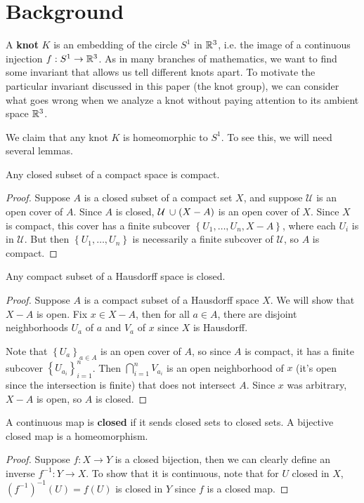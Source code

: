 \documentclass[twoside,10pt]{article}
\begin{document}
\section{Background}

A \textbf{knot} $K$ is an embedding of the circle $S^{1}$ in $\mathbb{R}^{3}$, i.e. the image of a continuous injection $f:S^{1}\to \mathbb{R}^{3}$. As in many branches of mathematics, we want to find some invariant that allows us tell different knots apart. To motivate the particular invariant discussed in this paper (the knot group), we can consider what goes wrong when we analyze a knot without paying attention to its ambient space $\mathbb{R}^{3}$.

We claim that any knot $K$ is homeomorphic to $S^{1}$. To see this, we will need several lemmas.


\begin{lem}
	\label{closed-compact}
Any closed subset of a compact space is compact.
\end{lem}
\begin{proof}
	Suppose $A$ is a closed subset of a compact set $X$, and suppose $\mathcal{U}$ is an open cover of $A$. Since $A$ is closed, $\mathcal{U} \operatorname{\;\cup\;} (X-A)$ is an open cover of $X$. Since $X$ is compact, this cover has a finite subcover $\left\{ U_1, \dots, U_n, X-A \right\}$, where each $U_i$ is in $\mathcal{U}$. But then $\left\{ U_1, \dots, U_n \right\}$ is necessarily a finite subcover of $\mathcal{U}$, so $A$ is compact.
\end{proof}

\begin{lem}
	\label{compact-haus}
Any compact subset of a Hausdorff space is closed.
\end{lem}
\begin{proof}
	Suppose $A$ is a compact subset of a Hausdorff space $X$. We will show that $X-A$ is open. Fix $x \in X-A$, then for all $a \in A$, there are disjoint neighborhoods $U_a$ of $a$ and $V_{a}$ of $x$ since $X$ is Hausdorff.

	Note that $\left\{ U_a \right\}_{a\in A}$ is an open cover of $A$, so since $A$ is compact, it has a finite subcover $\left\{ U_{a_i} \right\}_{i=1}^{n}$. Then $\bigcap_{i=1}^{n}V_{a_i}$ is an open neighborhood of $x$ (it's open since the intersection is finite) that does not intersect $A$. Since $x$ was arbitrary, $X-A$ is open, so $A$ is closed.
\end{proof}

\begin{lem}
	\label{bij-closed-homeo}
A continuous map is \textbf{closed} if it sends closed sets to closed sets. A bijective closed map is a homeomorphism.
\end{lem}
\begin{proof}
	Suppose $f:X\to Y$ is a closed bijection, then we can clearly define an inverse $f^{-1}:Y\to X$. To show that it is continuous, note that for $U$ closed in $X$, $(f^{-1})^{-1}(U) = f(U)$ is closed in $Y$ since $f$ is a closed map.
\end{proof}
\end{document}
